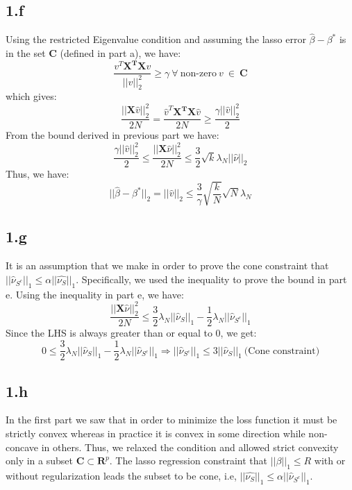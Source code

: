 \documentclass[12pt]{article}
\begin{document}
\subsection*{1.f}
Using the restricted Eigenvalue condition and assuming the lasso error $\hat{\beta} - \beta^*$ is in the set $\boldsymbol{C}$ (defined in part a), we have:
\begin{equation*}
    \frac{v^T\boldsymbol{X^TX}v}{||v||^2_2} \geq \gamma \ \forall \ \textrm{non-zero} \ v \ \in \ \boldsymbol{C}
\end{equation*}
which gives:
\begin{equation*}
    \frac{||\boldsymbol{X}\hat{v}||_2^2}{2N} = \frac{\hat{v}^T\boldsymbol{X^TX}\hat{v}}{2N} \geq \frac{\gamma ||\hat{v}||^2_2}{2}
\end{equation*}
From the bound derived in previous part we have:
\begin{equation*}
    \frac{\gamma ||\hat{v}||^2_2}{2} \leq \frac{||\boldsymbol{X}\hat{\nu}||^2_2}{2N} \leq  \frac{3}{2}\sqrt{k}\lambda_N||\hat{\nu}||_2 
\end{equation*}
Thus, we have:
\begin{equation*}
    ||\hat{\beta} - \beta^*||_2 = ||\hat{v}||_2 \leq \frac{3}{\gamma}\sqrt{\frac{k}{N}}\sqrt{N}\lambda_N 
\end{equation*}
\subsection*{1.g}
It is an assumption that we make in order to prove the cone constraint that $||\hat{\nu}_{S^c}||_1 \leq \alpha||\hat{\nu_S}||_1$. Specifically, we used the inequality to prove the bound in part e. Using the inequality in part e, we have:
\begin{equation*}
    \frac{||\boldsymbol{X}\hat{\nu}||^2_2}{2N} \leq \frac{3}{2}\lambda_N||\hat{\nu}_{S}||_1-\frac{1}{2}\lambda_N||\hat{\nu}_{S^c}||_1
\end{equation*}
Since the LHS is always greater than or equal to 0, we get:
\begin{equation*}
    0 \leq \frac{3}{2}\lambda_N||\hat{\nu}_{S}||_1-\frac{1}{2}\lambda_N||\hat{\nu}_{S^c}||_1 \Longrightarrow  ||\hat{\nu}_{S^c}||_1 \leq 3||\hat{\nu}_{S}||_1 \ \textrm{(Cone constraint)}
\end{equation*}
\subsection*{1.h}
In the first part we saw that in order to minimize the loss function it must be strictly convex whereas in practice it is convex in some direction while non-concave in others. Thus, we relaxed the condition and allowed strict convexity only in a subset $\boldsymbol{C} \subset \boldsymbol{R}^p$. The lasso regression constraint that $||\beta||_1 \leq R$ with or without regularization leads the subset to be cone, i.e, $||\hat{\nu_S}||_1 \leq \alpha||\hat{\nu}_{S^c}||_1$.
\end{document}
